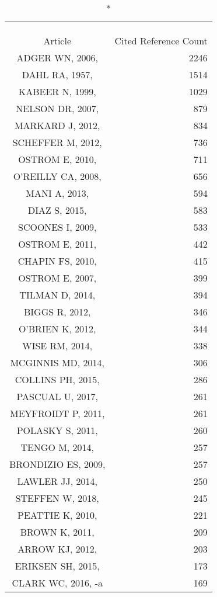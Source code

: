 \documentclass[]{article}
\begin{document}
\captionsetup[table]{labelformat=empty,skip=1pt}
\begin{longtable}{cr}
\caption*{
\large Citations' Most Frequently Cited References\textsuperscript{1}\\ 
\small \textsuperscript{}\\ 
} \\ 
\toprule
Article & Cited Reference Count \\ 
\midrule
ADGER WN, 2006,  & 2246 \\ 
DAHL RA, 1957,  & 1514 \\ 
KABEER N, 1999,  & 1029 \\ 
NELSON DR, 2007,  & 879 \\ 
MARKARD J, 2012,  & 834 \\ 
SCHEFFER M, 2012,  & 736 \\ 
OSTROM E, 2010,  & 711 \\ 
O'REILLY CA, 2008,  & 656 \\ 
MANI A, 2013,  & 594 \\ 
DIAZ S, 2015,  & 583 \\ 
SCOONES I, 2009,  & 533 \\ 
OSTROM E, 2011,  & 442 \\ 
CHAPIN FS, 2010,  & 415 \\ 
OSTROM E, 2007,  & 399 \\ 
TILMAN D, 2014,  & 394 \\ 
BIGGS R, 2012,  & 346 \\ 
O'BRIEN K, 2012,  & 344 \\ 
WISE RM, 2014,  & 338 \\ 
MCGINNIS MD, 2014,  & 306 \\ 
COLLINS PH, 2015,  & 286 \\ 
PASCUAL U, 2017,  & 261 \\ 
MEYFROIDT P, 2011,  & 261 \\ 
POLASKY S, 2011,  & 260 \\ 
TENGO M, 2014,  & 257 \\ 
BRONDIZIO ES, 2009,  & 257 \\ 
LAWLER JJ, 2014,  & 250 \\ 
STEFFEN W, 2018,  & 245 \\ 
PEATTIE K, 2010,  & 221 \\ 
BROWN K, 2011,  & 209 \\ 
ARROW KJ, 2012,  & 203 \\ 
ERIKSEN SH, 2015,  & 173 \\ 
CLARK WC, 2016, -a & 169 \\ 

\end{longtable}
\end{document}
